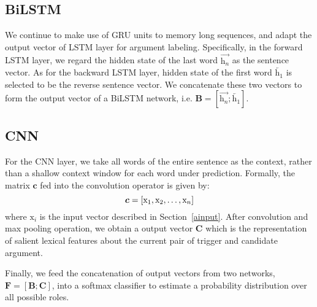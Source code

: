 \subsection{BiLSTM}
We continue to make use of GRU units to memory long sequences, and adapt the output vector of LSTM layer for argument labeling. Specifically, in the forward LSTM layer, we regard the hidden state of the last word $\overrightarrow{\text{h}_n}$ as the sentence vector. As for the backward LSTM layer, hidden state of the first word $\overleftarrow{\text{h}_1}$ is selected to be the reverse sentence vector. We concatenate these two vectors to form the output vector of a BiLSTM network, i.e. $\bm{B} = [\overrightarrow{\text{h}_n}; \overleftarrow{\text{h}_1}]$.

\subsection{CNN}
For the CNN layer, we take all words of the entire sentence as the context, rather than a shallow context window for each word under prediction. Formally, the matrix $\bm{c}$ fed into the convolution operator is given by:
\begin{equation}
	\bm{c} = [\text{x}_1, \text{x}_2, \ldots, \text{x}_n] \notag
\end{equation}
where $\text{x}_i$ is the input vector described in Section~\ref{ainput}. After convolution and max pooling operation, we obtain a output vector $\bm{C}$ which is the representation of salient lexical features about the current pair of trigger and candidate argument.

Finally, we feed the concatenation of output vectors from two networks, $\bm{F}=[\bm{B};\bm{C}]$, into a softmax classifier to estimate a probability distribution over all possible roles.